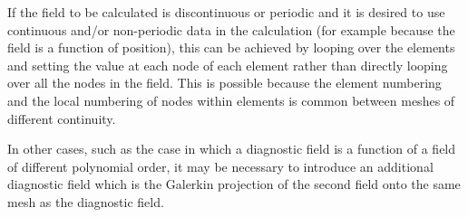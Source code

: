 If the field to be calculated is discontinuous or periodic and it is desired
to use continuous and/or non-periodic data in the calculation (for example
because the field is a function of position), this can be achieved by
looping over the elements and setting the value at each node of each
element rather than directly looping over all the nodes in the field. This
is possible because the element numbering and the local numbering of nodes within
elements is common between meshes of different continuity.

In other cases, such as the case in which a diagnostic field is a function
of a field of different polynomial order, it may be necessary to introduce
an additional diagnostic field which is the Galerkin projection of the
second field onto the same mesh as the diagnostic field.
